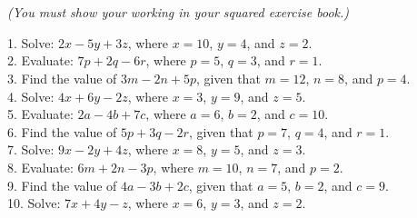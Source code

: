 \documentclass{article}
\date{}
\begin{document}
\fontsize{13}{15} \selectfont %

\begin{center}
  \qquad \\ 
\end{center} \\ 

\begin{center}
\vspace*{5pt} 
\textit{(You must show your working in your squared exercise book.)  }
\vspace{5pt}
\end{center}

1. Solve: \(2x - 5y + 3z\), where \(x = 10\), \(y = 4\), and \(z = 2\). \\

2. Evaluate: \(7p + 2q - 6r\), where \(p = 5\), \(q = 3\), and \(r = 1\). \\

3. Find the value of \(3m - 2n + 5p\), given that \(m = 12\), \(n = 8\), and \(p = 4\). \\

4. Solve: \(4x + 6y - 2z\), where \(x = 3\), \(y = 9\), and \(z = 5\). \\

5. Evaluate: \(2a - 4b + 7c\), where \(a = 6\), \(b = 2\), and \(c = 10\). \\

6. Find the value of \(5p + 3q - 2r\), given that \(p = 7\), \(q = 4\), and \(r = 1\). \\

7. Solve: \(9x - 2y + 4z\), where \(x = 8\), \(y = 5\), and \(z = 3\). \\

8. Evaluate: \(6m + 2n - 3p\), where \(m = 10\), \(n = 7\), and \(p = 2\). \\

9. Find the value of \(4a - 3b + 2c\), given that \(a = 5\), \(b = 2\), and \(c = 9\). \\

10. Solve: \(7x + 4y - z\), where \(x = 6\), \(y = 3\), and \(z = 2\). \\
\end{document}
